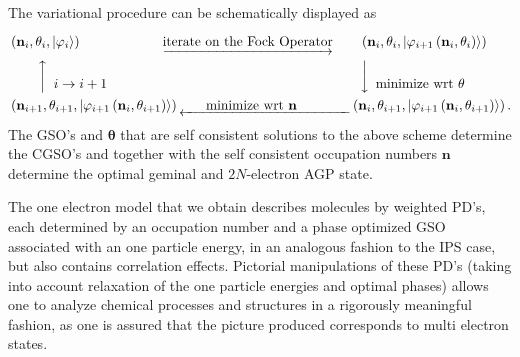 \documentclass[aps,preprint]{revtex4}%
\begin{document}
The variational procedure can be schematically displayed as
\begin{align}
&  \left(  \mathbf{n}_{i},\mathbf{\theta}_{i}\mathbf{,}\left\vert
\mathbf{\varphi}_{i}\right\rangle \right)  \overset{\text{ }}{\qquad
\qquad\qquad\underrightarrow{\text{iterate on the Fock Operator}}\qquad\left(
\mathbf{n}_{i},\mathbf{\theta}_{i}\mathbf{,}\left\vert \mathbf{\varphi}%
_{i+1}\left(  \mathbf{n}_{i},\mathbf{\theta}_{i}\right)  \right\rangle
\right)  }\nonumber\\
&  \qquad\left\uparrow
\begin{array}
[c]{c}%
\\
i\rightarrow i+1\\
\end{array}
\right.  \qquad\qquad\qquad\qquad\qquad\qquad\qquad\qquad\qquad
\left\downarrow
\begin{array}
[c]{c}%
\\
\text{minimize wrt }\mathbf{\theta}\\
\end{array}
\right. \nonumber\\
&  \left(  \mathbf{n}_{i+1},\mathbf{\theta}_{i+1}\mathbf{,}\left\vert
\mathbf{\varphi}_{i+1}\left(  \mathbf{n}_{i},\mathbf{\theta}_{i+1}\right)
\right\rangle \right)  \underleftarrow{\qquad\text{minimize wrt }%
\mathbf{n}\qquad\qquad}\left(  \mathbf{n}_{i},\mathbf{\theta}_{i+1}%
\mathbf{,}\left\vert \mathbf{\varphi}_{i+1}\left(  \mathbf{n}_{i}%
,\mathbf{\theta}_{i+1}\right)  \right\rangle \right)  .
\end{align}
The GSO's and $\mathbf{\theta}$ that are self consistent solutions to the
above scheme determine the CGSO's and together with the self consistent
occupation numbers $\mathbf{n}$ determine the optimal geminal and
$2N$-electron AGP state.

The one electron model that we obtain describes molecules by weighted PD's,
each determined by an occupation number and a phase optimized GSO associated
with an one particle energy, in an analogous fashion to the IPS case, but also
contains correlation effects. Pictorial manipulations of these PD's (taking
into account relaxation of the one particle energies and optimal phases)
allows one to analyze chemical processes and structures in a rigorously
meaningful fashion, as one is assured that the picture produced corresponds to
multi electron states.
\end{document}
